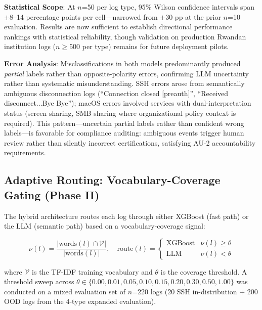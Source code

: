 \documentclass[futureinternet,article,submit,pdftex,moreauthors]{Definitions/mdpi}
\begin{document}
\textbf{Statistical Scope}: At $n$=50 per log type, 95\% Wilson confidence intervals span
$\pm$8--14 percentage points per cell---narrowed from $\pm$30 pp at the prior $n$=10
evaluation. Results are now sufficient to establish directional performance rankings
with statistical reliability, though validation on production Rwandan institution logs
($n \geq 500$ per type) remains for future deployment pilots.

\textbf{Error Analysis}: Misclassifications in both models predominantly produced
\textit{partial} labels rather than opposite-polarity errors, confirming LLM uncertainty
rather than systematic misunderstanding. SSH errors arose from semantically ambiguous
disconnection logs (``Connection closed [preauth]'', ``Received disconnect...Bye Bye'');
macOS errors involved services with dual-interpretation status (screen sharing, SMB sharing
where organizational policy context is required). This pattern---uncertain partial labels
rather than confident wrong labels---is favorable for compliance auditing: ambiguous events
trigger human review rather than silently incorrect certifications, satisfying AU-2
accountability requirements.

\subsection{Adaptive Routing: Vocabulary-Coverage Gating (Phase II)}
\label{sec:phase2_router}

The hybrid architecture routes each log through either XGBoost (fast path) or the LLM
(semantic path) based on a vocabulary-coverage signal:
\begin{linenomath}
\begin{equation}
\nu(l) = \frac{|\text{words}(l) \cap \mathcal{V}|}{|\text{words}(l)|}, \quad
\text{route}(l) = \begin{cases} \text{XGBoost} & \nu(l) \geq \theta \\ \text{LLM} & \nu(l) < \theta \end{cases}
\label{eq:router}
\end{equation}
\end{linenomath}
where $\mathcal{V}$ is the TF-IDF training vocabulary and $\theta$ is the coverage threshold.
A threshold sweep across $\theta \in \{0.00, 0.01, 0.05, 0.10, 0.15, 0.20, 0.30, 0.50, 1.00\}$
was conducted on a mixed evaluation set of $n$=220 logs (20 SSH in-distribution + 200 OOD
logs from the 4-type expanded evaluation).
\end{document}
